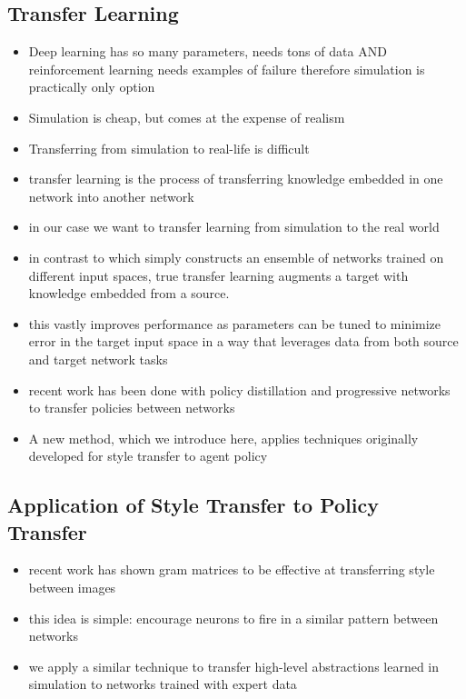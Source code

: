 \documentclass[paper=a4, fontsize=11pt]{scrartcl} %
\begin{document}
	\subsection{Transfer Learning}
	\begin{itemize}
		\item Deep learning has so many parameters, needs tons of data AND reinforcement learning needs examples of failure therefore simulation is practically only option
		\item Simulation is cheap, but comes at the expense of realism
		\item Transferring from simulation to real-life is difficult
		\item transfer learning is the process of transferring knowledge embedded in one network into another network
		\item in our case we want to transfer learning from simulation to the real world
		\item in contrast to \cite{Michels2005} which simply constructs an ensemble of networks trained on different input spaces, true transfer learning augments a target with knowledge embedded from a source.
		\item this vastly improves performance as parameters can be tuned to minimize error in the target input space in a way that leverages data from both source and target network tasks
		\item recent work has been done with policy distillation \cite{Rusu2015} and progressive networks \cite{Rusu2016} to transfer policies between networks
		\item A new method, which we introduce here, applies techniques originally developed for style transfer to agent policy~\cite{Gatys2015}
	\end{itemize}

	\subsection{Application of Style Transfer to Policy Transfer}
	\begin{itemize}
		\item recent work has shown gram matrices to be effective at transferring style between images \cite{Gatys2015}
		\item this idea is simple: encourage neurons to fire in a similar pattern between networks
		\item we apply a similar technique to transfer high-level abstractions learned in simulation to networks trained with expert data
	\end{itemize}
\end{document}
